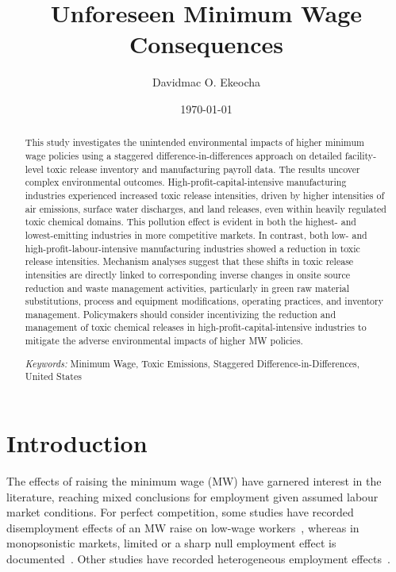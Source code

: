 \documentclass[12pt, english]{article}
\title{{Unforeseen Minimum Wage Consequences}}
\author[1]{Davidmac O. Ekeocha}
\affil[1]{
    University of Liverpool Management School \\
    \texttt{davidmac.ekeocha@liverpool.ac.uk}
}
\date{\today}
\begin{document}
    \maketitle
    \newpage
    \tableofcontents
    \newpage
    \listoffigures
    \newpage
    \listoftables

    \newpage
    \begin{abstract}
        \noindent This study investigates the unintended environmental impacts of higher minimum wage policies using a staggered difference-in-differences approach on detailed facility-level toxic release inventory and manufacturing payroll data. The results uncover complex environmental outcomes. High-profit-capital-intensive manufacturing industries experienced increased toxic release intensities, driven by higher intensities of air emissions, surface water discharges, and land releases, even within heavily regulated toxic chemical domains. This pollution effect is evident in both the highest- and lowest-emitting industries in more competitive markets. In contrast, both low- and high-profit-labour-intensive manufacturing industries showed a reduction in toxic release intensities. Mechanism analyses suggest that these shifts in toxic release intensities are directly linked to corresponding inverse changes in onsite source reduction and waste management activities, particularly in green raw material substitutions, process and equipment modifications, operating practices, and inventory management. Policymakers should consider incentivizing the reduction and management of toxic chemical releases in high-profit-capital-intensive industries to mitigate the adverse environmental impacts of higher MW policies.
        \par \noindent \textit{Keywords:} Minimum Wage, Toxic Emissions, Staggered Difference-in-Differences, United States
    \end{abstract}


    \section{Introduction}\label{sec:introduction}
    The effects of raising the minimum wage (MW) have garnered interest in the literature, reaching mixed conclusions for employment given assumed labour market conditions. For perfect competition, some studies have recorded disemployment effects of an MW raise on low-wage workers~\parencite{stigler1946economics, hamermesh1982minimum, neumark1992employment, brown1999minimum, machin2004minimum, neumark2000minimum, borjas2010labor}, whereas in monopsonistic markets, limited or a sharp null employment effect is documented~\parencite{lester1960employment, card1993minimum, card2000minimum, aaronson2018industry, cengiz2019effect, wong2019minimum, dustmann2022reallocation}. Other studies have recorded heterogeneous employment effects~\parencite{okudaira2019minimum, medrano2023minimum, meer2023effects, gregory2022minimum}.
\end{document}
